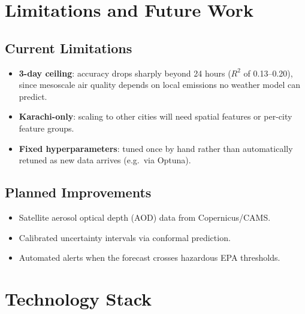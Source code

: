\documentclass[12pt, a4paper]{article}
\begin{document}
\section{Limitations and Future Work}

\subsection{Current Limitations}
\begin{itemize}
  \item \textbf{3-day ceiling}: accuracy drops sharply beyond 24 hours ($R^2$ of 0.13--0.20), since mesoscale air quality depends on local emissions no weather model can predict.
  \item \textbf{Karachi-only}: scaling to other cities will need spatial features or per-city feature groups.
  \item \textbf{Fixed hyperparameters}: tuned once by hand rather than automatically retuned as new data arrives (e.g.\ via Optuna).
\end{itemize}

\subsection{Planned Improvements}
\begin{itemize}
  \item Satellite aerosol optical depth (AOD) data from Copernicus/CAMS.
  \item Calibrated uncertainty intervals via conformal prediction.
  \item Automated alerts when the forecast crosses hazardous EPA thresholds.
\end{itemize}


\section{Technology Stack}
\end{document}
